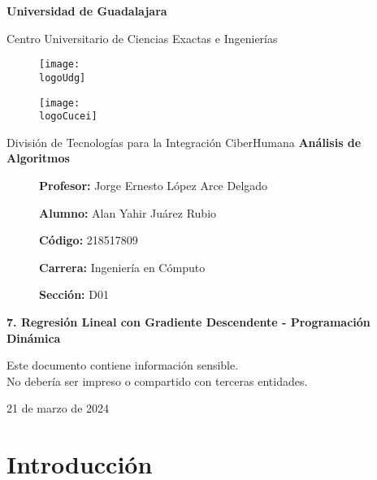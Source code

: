 \documentclass[12pt, a4paper]{article} %
\title{\theTitle}
\author{\theAuthor}
\newcommand{\logoUdg}{../../../../../attachments/images/portada-udg.jpeg}
\newcommand{\logoCucei}{../../../../../attachments/images/portada-cucei.jpeg}
\newcommand{\materia}{Análisis de Algoritmos}
\newcommand{\theTitle}{7. Regresión Lineal con Gradiente Descendente - Programación Dinámica}
\newcommand{\profesor}{Jorge Ernesto López Arce Delgado}
\newcommand{\theAuthor}{Alan Yahir Juárez Rubio}
\newcommand{\code}{218517809}
\newcommand{\carrera}{Ingeniería en Cómputo}
\newcommand{\seccion}{D01}
\newcommand{\startDate}{21 de marzo de 2024}
\newcommand{\nl}{\par\vspace{0.4cm}}
\begin{document}
\cfoot{\thepage} %

\begin{titlepage}
	\centering
	{\huge\textbf{Universidad de Guadalajara}}\par\vspace{0.6cm}
	{\LARGE{Centro Universitario de Ciencias Exactas e Ingenierías}}\vfill
	
	\begin{figure}[h]
		\begin{minipage}[t]{0.45\textwidth}
			\centering
			\texttt{[image: \\logoUdg]}
		\end{minipage}
		\hfill
		\begin{minipage}[t]{0.45\textwidth}
			\centering
			\texttt{[image: \\logoCucei]}
		\end{minipage}
	\end{figure}\vfill
	
	{\Large{División de Tecnologías para la Integración CiberHumana}}\vfill
	{\Large\textbf{\materia}}\vfill
	\begin{figure}[h]
		\centering
		\begin{minipage}[t]{0.75\textwidth}
			{\Large
				\textbf{Profesor:} \profesor\nl
				\textbf{Alumno:} \theAuthor\nl
				\textbf{Código:} \code\nl
				\textbf{Carrera:} \carrera\nl
				\textbf{Sección:} \seccion
			}
		\end{minipage}
	\end{figure}\vfill
	{\LARGE{\textbf{\theTitle}}}\vfill
	
	\begin{tcolorbox}[colback=red!5!white, colframe=red!75!black]
		\centering
		Este documento contiene información sensible.\\
		No debería ser impreso o compartido con terceras entidades.
	\end{tcolorbox}\vfill
	{\large \startDate}\par
\end{titlepage}

\clearpage
\tableofcontents

\clearpage
\listoffigures
	

\clearpage
\section{Introducción}
\end{document}
